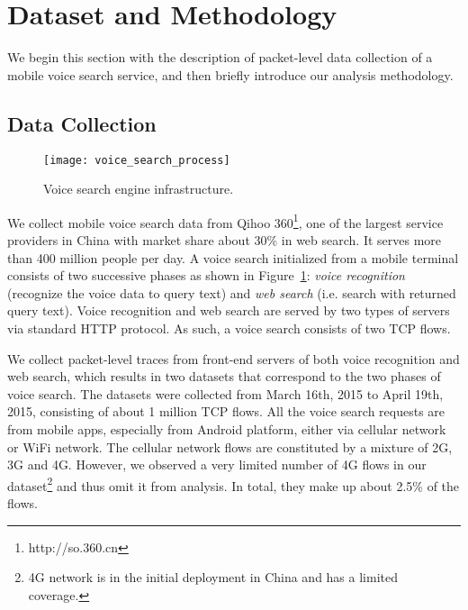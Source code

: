 
\section{Dataset and Methodology}
\label{sec:dataset}

We begin this section with the description of packet-level data collection of a mobile voice search service, and then briefly introduce our analysis methodology.

\subsection{Data Collection}

\begin{figure}[th]
	\centering
	\texttt{[image: voice\_search\_process]}
	\caption{Voice search engine infrastructure.}
	\label{fig:voice_search}
\end{figure}

We collect mobile voice search data from Qihoo 360\footnote{http://so.360.cn}, one of the largest service providers in China with market share about 30\% in web search. It serves more than 400 million people per day. A voice search initialized from a mobile terminal consists of two successive phases as shown in Figure~\ref{fig:voice_search}: \emph{voice recognition} (\ie recognize the voice data to query text) and \emph{web search} (i.e. search with returned query text). Voice recognition and web search are served by two types of servers via standard HTTP protocol. As such, a voice search consists of two TCP flows.


We collect packet-level traces from front-end servers of both voice recognition and web search, which results in two datasets that correspond to the two phases of voice search. The datasets were collected from March 16th, 2015 to April 19th, 2015, consisting of about 1 million TCP flows.
All the voice search requests are from mobile apps, especially from Android platform, either via cellular network or WiFi network. The cellular network flows are constituted by a mixture of 2G, 3G and 4G. However, we observed a very limited number of 4G flows in our dataset\footnote{4G network is in the initial deployment in China and has a limited coverage.} and thus omit it from analysis. In total, they make up about 2.5\% of the flows.


